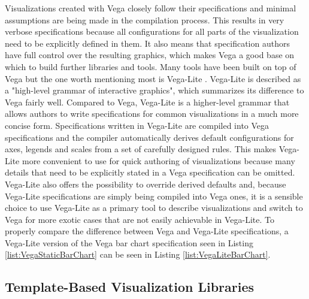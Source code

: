 Visualizations created with Vega closely follow their specifications and minimal assumptions are being made in the compilation process. This results in very verbose specifications because all configurations for all parts of the visualization need to be explicitly defined in them. It also means that specification authors have full control over the resulting graphics, which makes Vega a good base on which to build further libraries and tools. Many tools \parencite{Voyager,Lyra,CompassQL} have been built on top of Vega but the one worth mentioning most is Vega-Lite \parencite{VegaLite}. Vega-Lite is described as a "high-level grammar of interactive graphics", which summarizes its difference to Vega fairly well. Compared to Vega, Vega-Lite is a higher-level grammar that allows authors to write specifications for common visualizations in a much more concise form. Specifications written in Vega-Lite are compiled into Vega specifications and the compiler automatically derives default configurations for axes, legends and scales from a set of carefully designed rules. This makes Vega-Lite more convenient to use for quick authoring of visualizations because many details that need to be explicitly stated in a Vega specification can be omitted. Vega-Lite also offers the possibility to override derived defaults and, because Vega-Lite specifications are simply being compiled into Vega ones, it is a sensible choice to use Vega-Lite as a primary tool to describe visualizations and switch to Vega for more exotic cases that are not easily achievable in Vega-Lite. To properly compare the difference between Vega and Vega-Lite specifications, a Vega-Lite version of the Vega bar chart specification seen in Listing \ref{list:VegaStaticBarChart} can be seen in Listing \ref{list:VegaLiteBarChart}.

\begin{samepage}
 is a Vega-Lite specification of the Vega bar chart specification seen in Listing \ref{list:VegaStaticBarChart} combined with Listing \ref{list:VegaBarChart}.
  },
]{listings/vega-lite-bar-chart.json}
\end{samepage}

\subsection{Template-Based Visualization Libraries}

